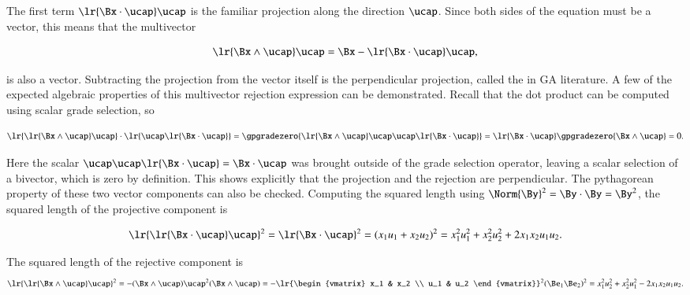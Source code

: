 The first term \( \lr{ \Bx \cdot \ucap } \ucap \) is the familiar projection along the direction \( \ucap \).
Since both sides of the equation must be a vector, this means that the multivector

\begin{dmath}\label{eqn:SimpleProducts2:700}
\lr{ \Bx \wedge \ucap } \ucap
=\Bx - \lr{ \Bx \cdot \ucap } \ucap,
\end{dmath}

is also a vector.
Subtracting the projection from the vector itself is the perpendicular projection, called the  in GA literature.
A few of the expected algebraic properties of this multivector rejection expression can be demonstrated.
Recall that the dot product can be computed using scalar grade selection, so

\begin{dmath}\label{eqn:SimpleProducts2:720}
\lr{ \lr{ \Bx \wedge \ucap } \ucap } \cdot \lr{ \ucap \lr{ \Bx \cdot \ucap } }
=
\gpgradezero{ \lr{ \Bx \wedge \ucap } \ucap \ucap \lr{ \Bx \cdot \ucap } }
=
\lr{ \Bx \cdot \ucap }
\gpgradezero{ \Bx \wedge \ucap }
= 0.
\end{dmath}

Here the scalar \( \ucap \ucap \lr{ \Bx \cdot \ucap } = \Bx \cdot \ucap \) was brought outside of the grade selection operator, leaving a scalar selection of a bivector, which is zero by definition.
This shows explicitly that the projection and the rejection are perpendicular.
The pythagorean property of these two vector components can also be checked.
Computing the squared length using \( \Norm{\By}^2 = \By \cdot \By = \By^2 \), the squared length of the projective component is

\begin{dmath}\label{eqn:SimpleProducts2:740}
\lr{ \lr{\Bx \cdot \ucap } \ucap }^2
=
\lr{\Bx \cdot \ucap }^2
=
(x_1 u_1 + x_2 u_2)^2
=
x_1^2 u_1^2 + x_2^2 u_2^2 + 2 x_1 x_2 u_1 u_2.
\end{dmath}

The squared length of the rejective component is
\begin{dmath}\label{eqn:SimpleProducts2:760}
\lr{ \lr{\Bx \wedge \ucap } \ucap }^2
=
-(\Bx \wedge \ucap) \ucap^2 (\Bx \wedge \ucap)
=
-
\lr{\begin{vmatrix}
   x_1 & x_2 \\
   u_1 & u_2
\end{vmatrix}}^2
(\Be_1 \Be_2)^2
=
x_1^2 u_2^2 + x_2^2 u_1^2 - 2 x_1 x_2 u_1 u_2.
\end{dmath}

